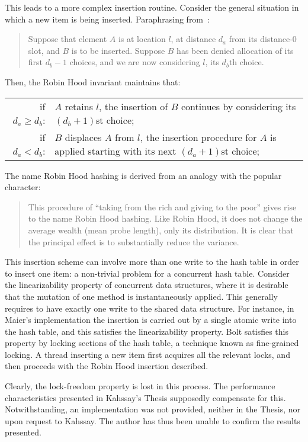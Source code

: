 This leads to a more complex insertion routine.
Consider the general situation in which a new item is being inserted.
Paraphrasing from~\cite{robin-hood}:
\begin{quote}
	Suppose that element $A$ is at location $l$, at distance $d_a$ from its distance-0 slot, and $B$ is to be inserted.
	Suppose $B$ has been denied allocation of its first $d_b - 1$ choices, and we are now considering $l$, its $d_b$th choice.
\end{quote}
Then, the Robin Hood invariant maintains that:

\begin{tabular}{rp{8cm}}
	if $d_a \geq d_b$: & $A$ retains $l$, the insertion of $B$ continues by considering its $(d_b + 1)$st choice; \\
	if $d_a < d_b$: & $B$ displaces $A$ from $l$, the insertion procedure for $A$ is applied starting with its next $(d_a + 1)$st choice; \\
\end{tabular}

The name Robin Hood hashing is derived from an analogy with the popular character:
\begin{quote}
	This procedure of ``taking from the rich and giving to the poor'' gives rise to the name Robin Hood hashing.
	Like Robin Hood, it does not change the average wealth (mean probe length), only its distribution.
	It is clear that the principal effect is to substantially reduce the variance.
\end{quote}

This insertion scheme can involve more than one write to the hash table in order to insert one item: a non-trivial problem for a concurrent hash table.
Consider the linearizability property of concurrent data structures, where it is desirable that the mutation of one method is instantaneously applied.
This generally requires to have exactly one write to the shared data structure.
For instance, in Maier's implementation the insertion is carried out by a single atomic write into the hash table, and this satisfies the linearizability property.
Bolt satisfies this property by locking sections of the hash table, a technique known as fine-grained locking.
A thread inserting a new item first acquires all the relevant locks, and then proceeds with the Robin Hood insertion described.

Clearly, the lock-freedom property is lost in this process.
The performance characteristics presented in Kahssay's Thesis supposedly compensate for this.
Notwithstanding, an implementation was not provided, neither in the Thesis, nor upon request to Kahssay.
The author has thus been unable to confirm the results presented.

